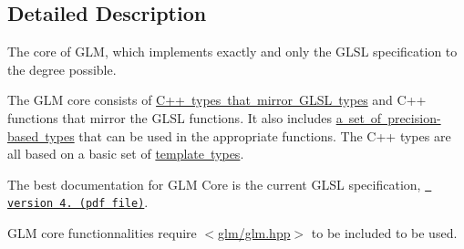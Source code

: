 \subsection{Detailed Description}
The core of G\+LM, which implements exactly and only the G\+L\+SL specification to the degree possible. 

The G\+LM core consists of \mbox{\hyperlink{group__core__types}{C++ types that mirror G\+L\+SL types}} and C++ functions that mirror the G\+L\+SL functions. It also includes \mbox{\hyperlink{group__core__precision}{a set of precision-\/based types}} that can be used in the appropriate functions. The C++ types are all based on a basic set of \mbox{\hyperlink{group__core__template}{template types}}.

The best documentation for G\+LM Core is the current G\+L\+SL specification, \href{http://www.opengl.org/registry/doc/GLSLangSpec.4.20.8.clean.pdf}{\texttt{ version 4. (pdf file)}}.

G\+LM core functionnalities require $<$\mbox{\hyperlink{glm_8hpp}{glm/glm.\+hpp}}$>$ to be included to be used. 
